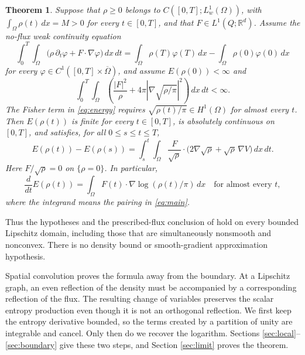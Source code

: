 \documentclass[11pt]{article}
\newtheorem{theorem}{Theorem}[section]
\newcommand{\R}{\mathbb R}
\newcommand{\dd}{\,dx}
\newcommand{\dt}{\,dt}
\newcommand{\grad}{\nabla}
\begin{document}
\begin{theorem}\label{thm:main}
Suppose that $\rho\geq0$ belongs to $C([0,T];L^1_w(\Omega))$, with
$\int_\Omega\rho(t)\dd=M>0$ for every $t\in[0,T]$, and that
$F\in L^1(Q;\R^d)$. Assume the no-flux weak continuity equation
\begin{equation}\label{eq:ce}
 \int_0^T\!\int_\Omega
   \bigl(\rho\,\partial_t\varphi+F\cdot\grad\varphi\bigr)\dd\dt
 =\int_\Omega\rho(T)\varphi(T)\dd
  -\int_\Omega\rho(0)\varphi(0)\dd
\end{equation}
for every $\varphi\in C^1([0,T]\times\overline\Omega)$, and assume
$E(\rho(0))<\infty$ and
\begin{equation}\label{eq:energy}
 \int_0^T\!\int_\Omega\left(
   \frac{|F|^2}{\rho}
   +4\pi\left|\grad\sqrt{\rho/\pi}\right|^2\right)\dd\dt<\infty.
\end{equation}
The Fisher term in \eqref{eq:energy} requires
$\sqrt{\rho(t)/\pi}\in H^1(\Omega)$ for almost every $t$.
Then $E(\rho(t))$ is finite for every $t\in[0,T]$, is absolutely continuous
on $[0,T]$, and satisfies, for all $0\leq s\leq t\leq T$,
\begin{equation}\label{eq:main}
 E(\rho(t))-E(\rho(s))
 =\int_s^t\!\int_\Omega
   \frac{F}{\sqrt\rho}\cdot
       \bigl(2\grad\sqrt\rho+\sqrt\rho\,\grad V\bigr)\dd\dt.
\end{equation}
Here $F/\sqrt\rho=0$ on $\{\rho=0\}$. In particular,
\begin{equation}\label{eq:derivative}
 \frac{d}{dt}E(\rho(t))
 =\int_\Omega F(t)\cdot\grad\log(\rho(t)/\pi)\dd
 \quad\text{for almost every }t,
\end{equation}
where the integrand means the pairing in \eqref{eq:main}.
\end{theorem}

Thus the hypotheses and the prescribed-flux conclusion of
\cite[Proposition A.1]{CMN} hold on every bounded Lipschitz domain, including
those that are simultaneously nonsmooth and nonconvex. There is no density
bound or smooth-gradient approximation hypothesis.

Spatial convolution proves the formula away from the boundary. At a
Lipschitz graph, an even reflection of the density must be accompanied by a
corresponding reflection of the flux. The resulting change of variables
preserves the scalar entropy production even though it is not an orthogonal
reflection. We first keep the entropy derivative bounded, so the terms
created by a partition of unity are integrable and cancel. Only then do we
recover the logarithm. Sections \ref{sec:local}--\ref{sec:boundary} give these
two steps, and Section \ref{sec:limit} proves the theorem.
\end{document}
